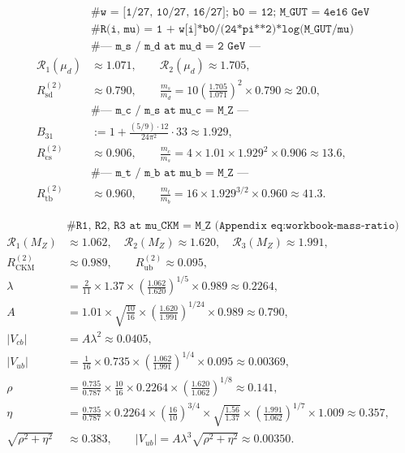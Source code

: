 \documentclass[11pt]{article}
\theoremstyle{plain}
\theoremstyle{definition}
\theoremstyle{remark}
\numberwithin{equation}{section}
\begin{document}
\begin{equation}\label{eq:workbook-quark-masses}
\begin{aligned}
  &\texttt{\# w = [1/27, 10/27, 16/27]; b0 = 12; M\_GUT = 4e16 GeV}\\
  &\texttt{\# R(i, mu) = 1 + w[i]*b0/(24*pi**2)*log(M\_GUT/mu)}\\
  &\texttt{\# --- m\_s / m\_d at mu\_d = 2 GeV ---}\\
  \mathcal{R}_1(\mu_d) &\approx 1.071,\qquad
  \mathcal{R}_2(\mu_d) \approx 1.705,\\
  R_{\mathrm{sd}}^{(2)} &\approx 0.790,
  \qquad
  \frac{m_s}{m_d}
  = 10\left(\frac{1.705}{1.071}\right)^{\!2}\times 0.790
  \approx 20.0,\\
  &\texttt{\# --- m\_c / m\_s at mu\_c = M\_Z ---}\\
  B_{31} &:= 1+\frac{(5/9)\cdot 12}{24\pi^2}\cdot 33 \approx 1.929,\\
  R_{\mathrm{cs}}^{(2)} &\approx 0.906,
  \qquad
  \frac{m_c}{m_s}
  = 4\times 1.01\times 1.929^{2}\times 0.906
  \approx 13.6,\\
  &\texttt{\# --- m\_t / m\_b at mu\_b = M\_Z ---}\\
  R_{\mathrm{tb}}^{(2)} &\approx 0.960,
  \qquad
  \frac{m_t}{m_b}
  = 16\times 1.929^{3/2}\times 0.960
  \approx 41.3.
\end{aligned}
\end{equation}

\begin{equation}\label{eq:workbook-ckm}
\begin{aligned}
  &\texttt{\# R1, R2, R3 at mu\_CKM = M\_Z (Appendix eq:workbook-mass-ratio)}\\
  \mathcal{R}_1(M_Z) &\approx 1.062,\quad
  \mathcal{R}_2(M_Z) \approx 1.620,\quad
  \mathcal{R}_3(M_Z) \approx 1.991,\\
  R_{\mathrm{CKM}}^{(2)} &\approx 0.989,\qquad
  R_{\mathrm{ub}}^{(2)} \approx 0.095,\\
  \lambda
  &= \frac{2}{11}\times 1.37\times
     \left(\frac{1.062}{1.620}\right)^{\!1/5}\times 0.989
  \approx 0.2264,\\
  A
  &= 1.01\times\sqrt{\frac{10}{16}}\times
     \left(\frac{1.620}{1.991}\right)^{\!1/24}\times 0.989
  \approx 0.790,\\
  |V_{cb}| &= A\lambda^2 \approx 0.0405,\\
  |V_{ub}|
  &= \frac{1}{16}\times 0.735\times
     \left(\frac{1.062}{1.991}\right)^{\!1/4}\times 0.095
  \approx 0.00369,\\
  \rho
  &= \frac{0.735}{0.787}\times\frac{10}{16}\times 0.2264\times
     \left(\frac{1.620}{1.062}\right)^{\!1/8}
  \approx 0.141,\\
  \eta
  &= \frac{0.735}{0.787}\times 0.2264\times
     \left(\frac{16}{10}\right)^{\!3/4}\times
     \sqrt{\frac{1.56}{1.37}}\times
     \left(\frac{1.991}{1.062}\right)^{\!1/7}\times 1.009
  \approx 0.357,\\
  \sqrt{\rho^2+\eta^2} &\approx 0.383,\qquad
  |V_{ub}| = A\lambda^3\sqrt{\rho^2+\eta^2} \approx 0.00350.
\end{aligned}
\end{equation}
\end{document}
